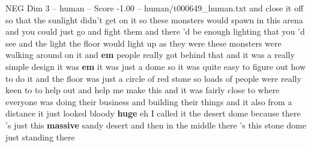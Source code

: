 \begin{textsample}{NEG Dim 3 – human – Score -1.00 – human/t000649\_human.txt}  \label{ex:f3_neg_033}
and close it off so that the sunlight didn't get on it so these monsters would spawn in this arena and you could just go and fight them and there 'd be enough lighting that you 'd see and the light the floor would light up as they were these monsters were walking around on it and \textbf{em} people really got behind that and it was a really simple design it was \textbf{em} it was just a dome so it was quite easy to figure out how to do it and the floor was just a circle of red stone so loads of people were really keen to to help out and help me make this and it was fairly close to where everyone was doing their business and building their things and it also from a distance it just looked bloody \textbf{huge} eh I called it the desert dome because there 's just this \textbf{massive} sandy desert and then in the middle there 's this stone dome just standing there

\end{textsample}

